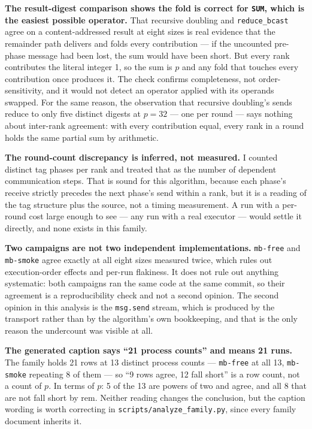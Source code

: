 \documentclass[11pt]{article}
\begin{document}
\textbf{The result-digest comparison shows the fold is correct for \texttt{SUM}, which is the
easiest possible operator.} That recursive doubling and \texttt{reduce\_bcast} agree on a
content-addressed result at eight sizes is real evidence that the remainder path delivers and
folds every contribution --- if the uncounted pre-phase message had been lost, the sum would have
been short. But every rank contributes the literal integer 1, so the sum is $p$ and any fold that
touches every contribution once produces it. The check confirms completeness, not
order-sensitivity, and it would not detect an operator applied with its operands swapped. For the
same reason, the observation that recursive doubling's sends reduce to only five distinct digests
at $p=32$ --- one per round --- says nothing about inter-rank agreement: with every contribution
equal, every rank in a round holds the same partial sum by arithmetic.

\textbf{The round-count discrepancy is inferred, not measured.} I counted distinct tag phases per
rank and treated that as the number of dependent communication steps. That is sound for this
algorithm, because each phase's receive strictly precedes the next phase's send within a rank,
but it is a reading of the tag structure plus the source, not a timing measurement. A run with a
per-round cost large enough to see --- any run with a real executor --- would settle it directly,
and none exists in this family.

\textbf{Two campaigns are not two independent implementations.} \texttt{mb-free} and
\texttt{mb-smoke} agree exactly at all eight sizes measured twice, which rules out
execution-order effects and per-run flakiness. It does not rule out anything systematic: both
campaigns ran the same code at the same commit, so their agreement is a reproducibility check and
not a second opinion. The second opinion in this analysis is the \texttt{msg.send} stream, which
is produced by the transport rather than by the algorithm's own bookkeeping, and that is the only
reason the undercount was visible at all.

\textbf{The generated caption says ``21 process counts'' and means 21 runs.} The family holds 21
rows at 13 distinct process counts --- \texttt{mb-free} at all 13, \texttt{mb-smoke} repeating 8
of them --- so ``9 rows agree, 12 fall short'' is a row count, not a count of $p$. In terms of
$p$: 5 of the 13 are powers of two and agree, and all 8 that are not fall short by
$\mathrm{rem}$. Neither reading changes the conclusion, but the caption wording is worth
correcting in \texttt{scripts/analyze\_family.py}, since every family document inherits it.
\end{document}
